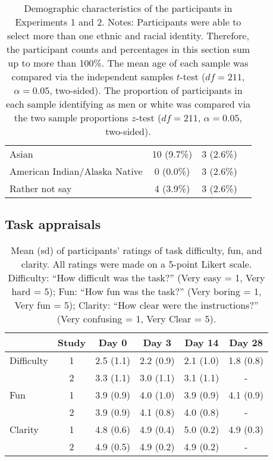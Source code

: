 \documentclass[a4paper,12pt]{article}
\begin{document}
\begin{refsection}[supp]
\begin{table}[h]
\begin{tabular*}{\textwidth}{lccc}
    \hspace{1em} Asian                     & 10  (9.7\%) &   3  (2.6\%) & \\
    \hspace{1em} American Indian/Alaska Native & 0 (0.0\%) & 3 (2.6\%) & \\
    \hspace{1em} Rather not say            &  4  (3.9\%) &  3  (2.6\%) & \\
    \bottomrule
    \end{tabular*}
    \caption{Demographic characteristics of the participants in Experiments 1 and 2. Notes: Participants were able to select more than one ethnic and racial identity. Therefore, the participant counts and percentages in this section sum up to more than 100\%. The mean age of each sample was compared via the independent samples $t$-test ($df = 211$, $\alpha = 0.05$, two-sided). The proportion of participants in each sample identifying as men or white was compared via the two sample proportions $z$-test ($df = 211$, $\alpha = 0.05$, two-sided).}
    \label{tab:demographics}
\end{table}

\clearpage
\subsection*{Task appraisals}

\begin{table}[h!]
    \centering
    \begin{tabular}{lccccc}
    \toprule
               & Study &   Day 0 &      Day 3 &     Day 14 &     Day 28 \\
    \midrule
    Difficulty &  1 &  2.5 (1.1) &  2.2 (0.9) &  2.1 (1.0) &  1.8 (0.8) \\
               &  2 &  3.3 (1.1) &  3.0 (1.1) &  3.1 (1.1) &          - \\
    \midrule
    Fun        &  1 &  3.9 (0.9) &  4.0 (1.0) &  3.9 (0.9) &  4.1 (0.9) \\
               &  2 &  3.9 (0.9) &  4.1 (0.8) &  4.0 (0.8) &          - \\
    \midrule
    Clarity    &  1 &  4.8 (0.6) &  4.9 (0.4) &  5.0 (0.2) &  4.9 (0.3) \\
               &  2 &  4.9 (0.5) &  4.9 (0.2) &  4.9 (0.2) &          - \\
    \bottomrule
    \end{tabular}
    \caption{Mean (sd) of participants' ratings of task difficulty, fun, and clarity. All ratings were made on a 5-point Likert scale. Difficulty: ``How difficult was the task?'' (Very easy = 1, Very hard = 5); Fun: ``How fun was the task?'' (Very boring = 1, Very fun = 5); Clarity: ``How clear were the instructions?'' (Very confusing = 1, Very Clear = 5).}
    \label{tab:tabS02}
\end{table}


\end{refsection}
\end{document}
